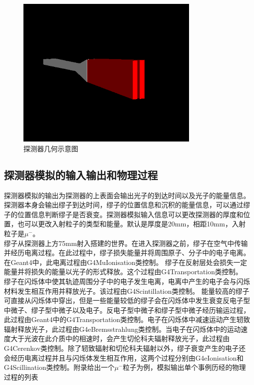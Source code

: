 \documentclass[aps,prd,superscriptaddress,nofootinbib,preprint]{ctexart}
\begin{document}
\begin{CJK}{UTF8}{gbsn}
\begin{figure}[h]
    \centering\includegraphics[width=0.8\textwidth]{pic/muonde1.png}
    \caption{探测器几何示意图}\label{maAge}
\end{figure}

\subsection{探测器模拟的输入输出和物理过程}


探测器模拟的输出为探测器的上表面会输出光子的到达时间以及光子的能量信息。探测器本身会输出缪子到达时间，缪子的位置信息和沉积的能量信息，可以通过缪子的位置信息判断缪子是否衰变。探测器模拟输入信息可以更改探测器的厚度和位置，也可以更改入射粒子的类型和能量。默认是厚度是20mm，相距10mm，入射粒子是$\mu^-$。\\

缪子从探测器上方75mm射入搭建的世界。在进入探测器之前，缪子在空气中传输并经历电离过程。在此过程中，缪子损失能量并将周围原子、分子中的电子电离。在Geant4中，此电离过程由G4MuIonisation类控制。
缪子在反射层处会损失一定能量并将损失的能量以光子的形式释放。这个过程由G4Transportation类控制。
缪子在闪烁体中使其轨迹周围分子中的电子发生电离，电离中产生的电子会与闪烁材料发生相互作用并释放光子。该过程由G4Scintillation类控制。
能量较高的缪子可直接从闪烁体中穿出，但是一些能量较低的缪子会在闪烁体中发生衰变反电子型中微子、缪子型中微子以及电子。反电子型中微子和缪子型中微子经历输运过程，此过程由Geant4中的G4Transportation类控制。电子在闪烁体中减速运动产生轫致辐射释放光子，此过程由G4eBremsstrahlung类控制。当电子在闪烁体中的运动速度大于光波在此介质中的相速时，会产生切伦科夫辐射释放光子，此过程由G4Cerenkov类控制。除了轫致辐射和切伦科夫辐射以外，缪子衰变产生的电子还会经历电离过程并且与闪烁体发生相互作用，这两个过程分别由G4eIonisation和G4Scillination类控制。附录给出一个$\mu^-$粒子为例，模拟输出单个事例历经的物理过程的列表



\end{CJK}
\end{document}
